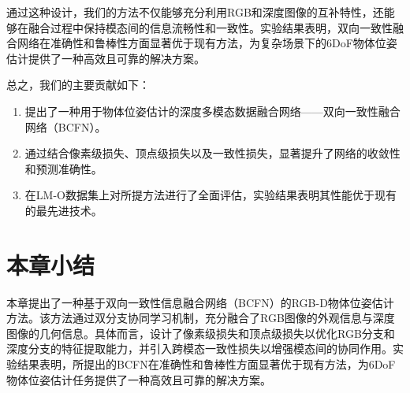 通过这种设计，我们的方法不仅能够充分利用RGB和深度图像的互补特性，还能够在融合过程中保持模态间的信息流畅性和一致性。实验结果表明，双向一致性融合网络在准确性和鲁棒性方面显著优于现有方法，为复杂场景下的6DoF物体位姿估计提供了一种高效且可靠的解决方案。

总之，我们的主要贡献如下：
\begin{enumerate}
\item 提出了一种用于物体位姿估计的深度多模态数据融合网络——双向一致性融合网络（BCFN）。
\item 通过结合像素级损失、顶点级损失以及一致性损失，显著提升了网络的收敛性和预测准确性。
\item 在LM-O数据集上对所提方法进行了全面评估，实验结果表明其性能优于现有的最先进技术。
\end{enumerate}


\section{本章小结}
本章提出了一种基于双向一致性信息融合网络（BCFN）的RGB-D物体位姿估计方法。该方法通过双分支协同学习机制，充分融合了RGB图像的外观信息与深度图像的几何信息。具体而言，设计了像素级损失和顶点级损失以优化RGB分支和深度分支的特征提取能力，并引入跨模态一致性损失以增强模态间的协同作用。实验结果表明，所提出的BCFN在准确性和鲁棒性方面显著优于现有方法，为6DoF物体位姿估计任务提供了一种高效且可靠的解决方案。